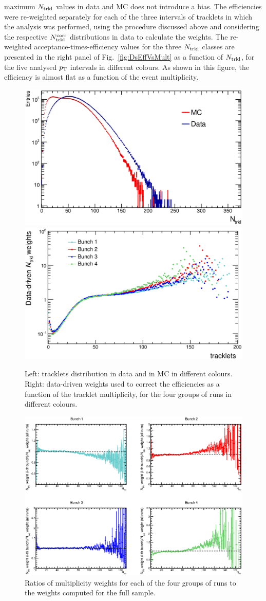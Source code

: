maximum $N_{\rm trkl}$ values in data and MC does not introduce a bias.
The efficiencies were re-weighted separately for each of the three intervals of tracklets
in which the analysis was performed, using the procedure discussed above and considering
the respective $N_{\rm trkl}^{\rm corr}$ distributions in data to calculate the weights.
The re-weighted acceptance-times-efficiency values for the three $N_{\rm trkl}$ classes are presented in 
the right panel of Fig.~\ref{fig:DsEffVsMult} as a function of $N_{\rm trkl}$, for the five analysed $p_{\rm T}$ intervals
in different colours. As shown in this figure, the efficiency is almost flat 
as a function of the event multiplicity.\\


\begin{figure}[h]
\centering
 \includegraphics[width=.49\textwidth]{FigCap6/NtrkDistrDDataMC.eps}
 \includegraphics[width=.49\textwidth]{FigCap6/NtrklWeightsMC_4bunches.eps}
 \caption{Left: tracklets distribution in data and in MC in different colours. Right: data-driven weights used to correct the efficiencies as a function of the tracklet multiplicity, for the four groups of runs in different colours.}
 \label{fig:NtrklDataMC}
\end{figure}

\begin{figure}[h]
\centering
 \includegraphics[width=.9\textwidth]{FigCap6/NtrkDistrMC_17d2a_EvWithD_zVxtUnCorr_896_897.eps}
 \caption{Ratios of multiplicity weights for each of the four groups of runs to the weights computed for the full sample.}
 \label{fig:RatioNtrklMC}
\end{figure}

